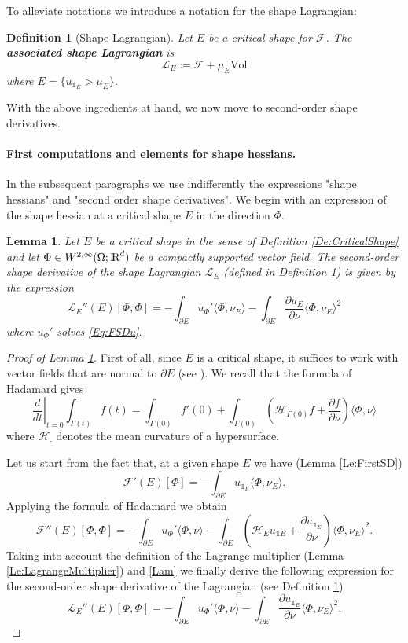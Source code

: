 \documentclass{article}
\newcommand{\R}{\textnormal{I\kern-0.21emR}}
\newtheorem{definition}[material]{Definition}
\newtheorem{lemma}[material]{Lemma}
\def\O{{\Omega}}
\numberwithin{equation}{section}
\begin{document}
To alleviate notations we introduce a notation for the shape Lagrangian:
\begin{definition}[Shape Lagrangian]\label{De:ShapeLagrangian}Let $E$ be a critical shape for $\mathscr F$. The \textbf{associated shape Lagrangian} is 
\[ \mathscr L_E:=\mathscr F+\mu_E \mathrm{Vol}\] where $E=\{u_{\mathds 1_E}>\mu_E\}$.\end{definition}

With the above ingredients at hand, we now move to second-order shape derivatives.

\paragraph{First computations and elements for shape hessians.} In the subsequent paragraphs we use indifferently the expressions "shape hessians" and "second order shape derivatives". We begin with an expression of the shape hessian at a critical shape $E$ in the direction $\Phi$.
\begin{lemma}\label{Le:SecondSD}
Let $E$ be a critical shape in the sense of Definition \ref{De:CriticalShape} and let $\Phi\in W^{2,\infty}(\O;\R^d)$ be a compactly supported vector field. The second-order shape derivative of the shape Lagrangian $\mathscr L_E$ (defined in Definition \ref{De:ShapeLagrangian}) is given by the expression
\[\mathscr L_E''(E)[\Phi,\Phi]= -\int_{\partial E}u_\Phi'\langle \Phi,\nu_E\rangle-\int_{\partial E}\frac{\partial u_E}{\partial \nu}\langle \Phi,\nu_E\rangle^2
\]
where $u_\Phi'$ solves \eqref{Eq:FSDu}.
\end{lemma}
\begin{proof}[Proof of Lemma \ref{Le:SecondSD}]First of all, since $E$ is a critical shape, it suffices to work with vector fields that are normal to $\partial E$ (see \cite[Remark on page 246]{HenrotPierre}).
We recall that the formula of Hadamard gives
\[
\left.\frac{d}{dt}\right|_{t=0}\int_{\Gamma(t)}f(t)=\int_{\Gamma(0)} f'(0)+\int_{\Gamma(0)}\left(\mathscr H_{\Gamma(0)} f+\frac{\partial f}{\partial \nu}\right)\langle \Phi,\nu\rangle\] where 
$\mathscr H_{\cdot}$ denotes the mean curvature of a hypersurface.

Let us start from the fact that, at a given shape $E$ we have (Lemma \ref{Le:FirstSD})
\[\mathscr F'(E)[\Phi]=-\int_{\partial E} u_{\mathds 1_E} \langle \Phi,\nu_E\rangle.\] Applying the formula of Hadamard we obtain
\[
\mathscr F''(E)[\Phi,\Phi]=-\int_{\partial E} u_\Phi'\langle \Phi,\nu\rangle-\int_{\partial E}\left( \mathscr H_{ E} u_{\mathds 1E}+\frac{\partial u_{\mathds 1_E}}{\partial \nu}\right)\langle \Phi,\nu_E\rangle^2.
\]
Taking into account the definition of the Lagrange multiplier (Lemma \ref{Le:LagrangeMultiplier}) and \eqref{Lam}
 we finally derive the following expression for the second-order shape derivative of the Lagrangian (see Definition \ref{De:ShapeLagrangian})
\begin{equation}\label{Eq:EllDirichletLagrangianDS}
\mathscr L_{E}''(E)[\Phi,\Phi]=-\int_{\partial E} u_\Phi'\langle \Phi,\nu\rangle-\int_{\partial E} \frac{\partial u_{\mathds 1_E}}{\partial \nu}\langle \Phi,\nu_E\rangle^2.\end{equation}
\end{proof}
\end{document}

